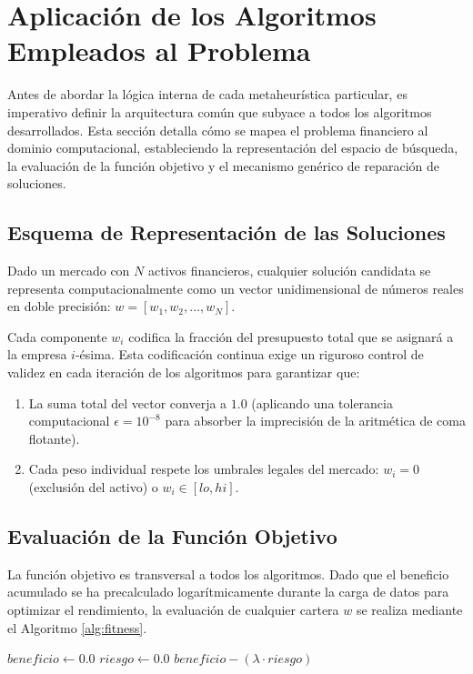 \newpage
\section{Aplicación de los Algoritmos Empleados al Problema}
\label{sec:aplicacion_comun}

Antes de abordar la lógica interna de cada metaheurística particular, es imperativo definir la arquitectura común que subyace a todos los algoritmos desarrollados. Esta sección detalla cómo se mapea el problema financiero al dominio computacional, estableciendo la representación del espacio de búsqueda, la evaluación de la función objetivo y el mecanismo genérico de reparación de soluciones.

\subsection{Esquema de Representación de las Soluciones}
Dado un mercado con $N$ activos financieros, cualquier solución candidata se representa computacionalmente como un vector unidimensional de números reales en doble precisión: 
$w = [w_1, w_2, \dots, w_N]$. 

Cada componente $w_i$ codifica la fracción del presupuesto total que se asignará a la empresa $i$-ésima. Esta codificación continua exige un riguroso control de validez en cada iteración de los algoritmos para garantizar que:
\begin{enumerate}
    \item La suma total del vector converja a $1.0$ (aplicando una tolerancia computacional $\epsilon = 10^{-8}$ para absorber la imprecisión de la aritmética de coma flotante).
    \item Cada peso individual respete los umbrales legales del mercado: $w_i = 0$ (exclusión del activo) o $w_i \in [lo, hi]$.
\end{enumerate}

\subsection{Evaluación de la Función Objetivo}
La función objetivo es transversal a todos los algoritmos. Dado que el beneficio acumulado se ha precalculado logarítmicamente durante la carga de datos para optimizar el rendimiento, la evaluación de cualquier cartera $w$ se realiza mediante el Algoritmo \ref{alg:fitness}.

\begin{algorithm}[H]
\SetAlgoLined
{}
 $beneficio \leftarrow 0.0$\;
 $riesgo \leftarrow 0.0$\;
 \Return $beneficio - (\lambda \cdot riesgo)$\;
 \caption{Evaluación de la Función Objetivo}
 \label{alg:fitness}
\end{algorithm}

